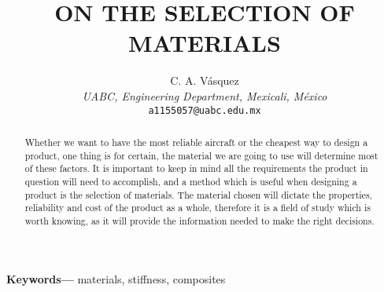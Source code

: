 \documentclass[letterpaper]{article}
\title{\textbf{ON THE SELECTION OF MATERIALS}}
\author{C. A. Vásquez\\
\footnotesize {\textit{UABC, Engineering Department, Mexicali, México}}\\
\footnotesize \texttt{a1155057@uabc.edu.mx}}
\date{}
\begin{document}
\maketitle

\begin{abstract}
	Whether we want to have the most reliable aircraft or the cheapest way to design a product, one thing is for certain, the material we are going to use will determine most of these factors. It is important to keep in mind all the requirements the product in question will need to accomplish, and a method which is useful when designing a product is the selection of materials. The material chosen will dictate the properties, reliability and cost of the product as a whole, therefore it is a field of study which is worth knowing, as it will provide the information needed to make the right decisions.
\end{abstract}
	{\bf Keywords---} materials, stiffness, composites
\end{document}
